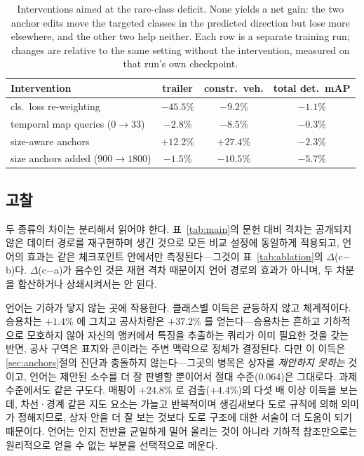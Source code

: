 \documentclass[conference]{IEEEtran}
\newcommand{\measured}[1]{#1}
\begin{document}
\begin{table}[t]
\caption{Interventions aimed at the rare-class deficit. None yields a net
gain: the two anchor edits move the targeted classes in the predicted
direction but lose more elsewhere, and the other two help neither. Each row is
a separate training run; changes are relative to the same setting without the
intervention, measured on that run's own checkpoint.}
\label{tab:negative}
\centering
\small
\begin{tabular}{lccc}
\toprule
Intervention & trailer & constr.\ veh. & total det.\ mAP \\
\midrule
cls.\ loss re-weighting & \measured{$-45.5$\%} & \measured{$-9.2$\%}  & \measured{$-1.1$\%}\\
temporal map queries ($0\!\to\!33$) & \measured{$-2.8$\%}  & \measured{$-8.5$\%}  & \measured{$-0.3$\%}\\
size-aware anchors & \measured{$+12.2$\%} & \measured{$+27.4$\%} & \measured{$-2.3$\%}\\
size anchors added ($900\!\to\!1800$) & \measured{$-1.5$\%} & \measured{$-10.5$\%} & \measured{$-5.7$\%}\\
\bottomrule
\end{tabular}
\end{table}

\subsection{고찰}
\label{sec:discussion}
두 종류의 차이는 분리해서 읽어야 한다. 표~\ref{tab:main}의 문헌 대비 격차는 공개되지
않은 데이터 경로를 재구현하며 생긴 것으로 모든 비교 설정에 동일하게 적용되고, 언어의
효과는 같은 체크포인트 안에서만 측정된다---그것이 표~\ref{tab:ablation}의
$\Delta$(c$-$b)다. $\Delta$(c$-$a)가 음수인 것은 재현 격차 때문이지 언어 경로의 효과가
아니며, 두 차분을 합산하거나 상쇄시켜서는 안 된다.

언어는 기하가 닿지 않는 곳에 작용한다. 클래스별 이득은 균등하지 않고 체계적이다. 승용차는 \measured{$+1.4$}\% 에 그치고 공사차량은
\measured{$+37.2$}\% 를 얻는다---승용차는 흔하고 기하적으로 모호하지 않아 자신의 앵커에서
특징을 추출하는 쿼리가 이미 필요한 것을 갖는 반면, 공사 구역은 표지와 콘이라는 주변
맥락으로 정체가 결정된다. 다만 이 이득은 \ref{sec:anchors}절의 진단과 충돌하지 않는다---그곳의
병목은 상자를 \emph{제안하지 못하는} 것이고, 언어는 제안된 소수를 더 잘 판별할 뿐이어서
절대 수준(\measured{0.064})은 그대로다. 과제 수준에서도 같은 구도다.
매핑이 \measured{$+24.8$}\% 로 검출(\measured{$+4.4$}\%)의 다섯 배 이상 이득을 보는데, 차선·경계 같은 지도
요소는 가늘고 반복적이며 생김새보다 도로 규칙에 의해 의미가 정해지므로, 상자 안을 더
잘 보는 것보다 도로 구조에 대한 서술이 더 도움이 되기 때문이다. 언어는 인지 전반을 균일하게 밀어 올리는 것이 아니라 기하적
참조만으로는 원리적으로 얻을 수 없는 부분을 선택적으로 메운다.
\end{document}

